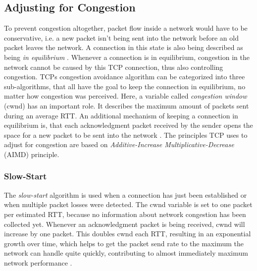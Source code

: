 \documentclass[a4paper,conference]{IEEEtran}
\begin{document}
\subsection{Adjusting for Congestion}
\label{AfC}
To prevent congestion altogether, packet flow inside a network would have to be conservative, i.e. a new packet isn't being sent into the network before an old packet leaves the network. A connection in this state is also being described as being \textit{in equilibrium} \cite{jacobson1992tcp}. Whenever a connection is in equilibrium, congestion in the network cannot be caused by this TCP connection, thus also controlling congestion. TCPs congestion avoidance algorithm can be categorized into three sub-algorithms, that all have the goal to keep the connection in equilibrium, no matter how congestion was perceived. Here, a variable called \textit{congestion window} (cwnd) has an important role. It describes the maximum amount of packets sent during an average RTT. An additional mechanism of keeping a connection in equilibrium is, that each acknowledgment packet received by the sender opens the space for a new packet to be sent into the network \cite{jacobson1992tcp}. The principles TCP uses to adjust for congestion are based on \textit{Additive-Increase Multiplicative-Decrease} (AIMD) principle.

\subsubsection*{Slow-Start}
The \textit{slow-start} algorithm is used when a connection has just been established or when multiple packet losses were detected. The cwnd variable is set to one packet per estimated RTT, because no information about network congestion has been collected yet. Whenever an acknowledgment packet is being received, cwnd will increase by one packet. This doubles cwnd each RTT, resulting in an exponential growth over time, which helps to get the packet send rate to the maximum the network can handle quite quickly, contributing to almost immediately maximum network performance \cite{jacobson1992tcp}.
\end{document}
